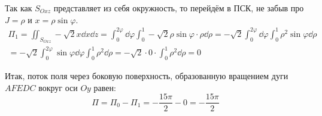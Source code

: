 Так как \(S_{Oxz}\) представляет из себя окружность, то перейдём
в ПСК, не забыв про \(J = \rho\) и \(x = \rho \sin\varphi\).
\[
\begin{split}
  \Pi_1
  = \iint_{S_{Oxz}} -\sqrt{2}x \dd x \dd z
  = \int_{0}^{2\varphi} \dd \varphi
    \int_{0}^{1} -\sqrt{2} \rho \sin\varphi \cdot \rho \dd \rho
  = -\sqrt{2} \int_{0}^{2\varphi} \dd \varphi
     \int_{0}^{1} \rho^2 \sin\varphi \dd \rho \\
  = -\sqrt{2} \int_{0}^{2 \varphi} \sin\varphi \dd \varphi
    \int_{0}^{1} \rho^2 \dd \rho
  = -\sqrt{2} \cdot 0 \cdot \int_{0}^{1} \rho^2 \dd \rho
  = 0
\end{split}
\]

Итак, поток поля через боковую поверхность,
образованную вращением дуги \(AFEDC\) вокруг оси \(Oy\) равен:
\begin{equation*}
    \Pi = \Pi_{0} - \Pi_{1} = -\frac{15\pi}{2} - 0 = -\frac{15\pi}{2}
\end{equation*}
